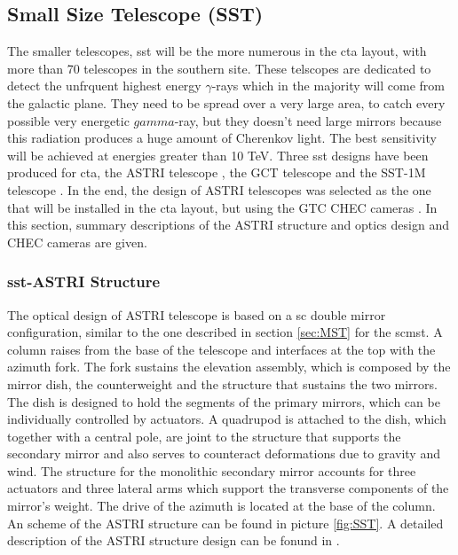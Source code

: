 \documentclass[main.tex]{subfiles}
\begin{document}
\subsection{Small Size Telescope (SST)}

The smaller telescopes, \gls{sst} will be the more numerous in the \gls{cta} layout, with more than 70 telescopes in the southern site. These telscopes are dedicated to detect the unfrquent highest energy $\gamma$-rays which in the majority will come from the galactic plane. They need to be spread over a very large area, to catch every possible very energetic $gamma$-ray, but they doesn't need large mirrors because this radiation produces a huge amount of Cherenkov light. The best sensitivity will be achieved at energies greater than 10 TeV. Three \gls{sst} designs have been produced  for \gls{cta}, the ASTRI telescope \cite{2017ASTRItels}, the GCT telescope \cite{2017CHECtels} and the SST-1M telescope \cite{2017SST1M}. In the end, the design of ASTRI telescopes was selected as the one that will be installed in the \gls{cta} layout, but using the GTC CHEC cameras \cite{2017CHECcam}. In this section, summary descriptions of the ASTRI structure and optics design and CHEC cameras are given.

\subsubsection{\gls{sst}-ASTRI Structure}

The optical design of ASTRI telescope is based on a \gls{sc} double mirror configuration, similar to the one described in section \ref{sec:MST} for the \gls{scmst}. A column raises from the base of the telescope and interfaces at the top with the azimuth fork. The fork sustains the elevation assembly, which is composed by the mirror dish, the counterweight and the structure that sustains the two mirrors. The dish is designed to hold the segments of the primary mirrors, which can be individually controlled by actuators. A quadrupod is attached to the dish, which together with a central pole, are joint to the structure that supports the secondary mirror and also serves to counteract deformations due to gravity and wind. The structure for the monolithic secondary mirror accounts for three actuators and three lateral arms which support the transverse components of the mirror's weight. The drive of the azimuth is located at the base of the column. An scheme of the ASTRI structure can be found in picture \ref{fig:SST}. A detailed description of the ASTRI structure design can be fonund in \cite{2013SSTstruct}.
\end{document}
